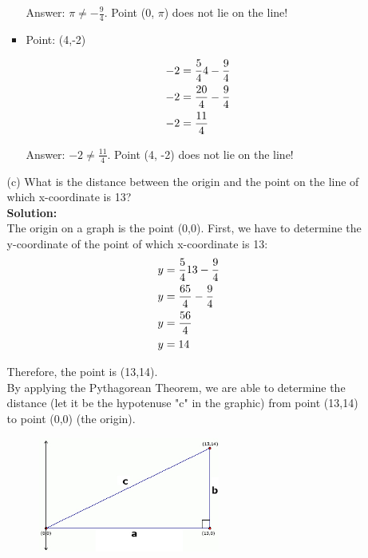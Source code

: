 \documentclass[a4paper]{article}
\begin{document}
\begin{enumerate}
\begin{itemize}
\begin{itemize}
Answer: $\pi \neq -\frac{9}{4}$. Point (0, $\pi$) does not lie on the line!\\	


	\item Point: (4,-2)
	
			\begin{align*}
		-2 &= \frac{5}{4}4 - \frac{9}{4}\notag \\
		-2 &= \frac{20}{4} - \frac{9}{4} \\
		-2 &= \frac{11}{4}
	\end{align*}	
	
Answer: $-2 \neq \frac{11}{4}$. Point (4, -2) does not lie on the line!\\		
	
\end{itemize}



	
	
	\item[(c)] What is the distance between the origin and the point on the line of which x-coordinate is 13?\\
	
	\textbf{Solution:}\\

The origin on a graph is the point (0,0). First, we have to determine the y-coordinate of the point of which x-coordinate is 13:\\

\begin{align*}
	y &= \frac{5}{4}13 - \frac{9}{4} \notag \\
	y &= \frac{65}{4} - \frac{9}{4} \notag \\
	y &= \frac{56}{4} \notag \\
	y &= 14 \notag
\end{align*}

Therefore, the point is (13,14).\\

By applying the Pythagorean Theorem, we are able to determine the distance (let it be the hypotenuse "c" in the graphic) from point (13,14) to point (0,0) (the origin).\\

\begin{figure}[ht]
	\centering
  \includegraphics[width=0.6\textwidth]{pythagoras.jpg}
\end{figure}


\end{itemize}
\end{enumerate}
\end{document}
